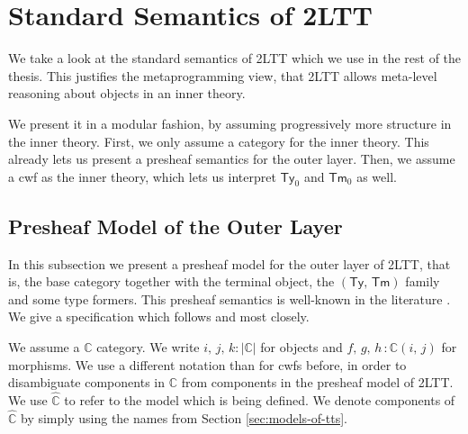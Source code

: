 \documentclass[12pt,a4paper,twoside,openany]{book}
\theoremstyle{remark}
\theoremstyle{definition}
\newtheorem{mydefinition}{Definition}
\newcommand{\ms}[1]{\mathsf{#1}}
\newcommand{\mbb}[1]{\mathbb{#1}}
\newcommand{\Tm}{\mathsf{Tm}}
\newcommand{\Ty}{\mathsf{Ty}}
\newcommand{\Lift}{\Uparrow}
\newcommand{\ext}{\triangleright}
\newcommand{\Bool}{\ms{Bool}}
\newcommand{\mbbC}{\mbb{C}}
\newcommand{\hmbbC}{\hat{\mbb{C}}}
\newcommand{\true}{\ms{true}}
\begin{document}

\section{Standard Semantics of 2LTT}

We take a look at the standard semantics of 2LTT which we use in the rest of the
thesis. This justifies the metaprogramming view, that 2LTT allows meta-level
reasoning about objects in an inner theory.

We present it in a modular fashion, by assuming progressively more structure in
the inner theory. First, we only assume a category for the inner theory. This
already lets us present a presheaf semantics for the outer layer. Then, we
assume a cwf as the inner theory, which lets us interpret $\Ty_0$ and $\Tm_0$ as
well.

\subsection{Presheaf Model of the Outer Layer}

In this subsection we present a presheaf model for the outer layer of 2LTT, that
is, the base category together with the terminal object, the $(\Ty,\,\Tm)$
family and some type formers. This presheaf semantics is well-known in the
literature \cite{TODO}. We give a specification which follows \cite{TODO} and
\cite{TODO} most closely.

We assume a $\mbbC$ category. We write $i,\,j,\,k : |\mbbC|$ for objects and
$f,\,g,\,h\,: \mbbC(i,\,j)$ for morphisms. We use a different notation than for
cwfs before, in order to disambiguate components in $\mbbC$ from components in
the presheaf model of 2LTT. We use $\hmbbC$ to refer to the model which is being
defined. We denote components of $\hmbbC$ by simply using the names from Section
\ref{sec:models-of-tts}.
\end{document}
